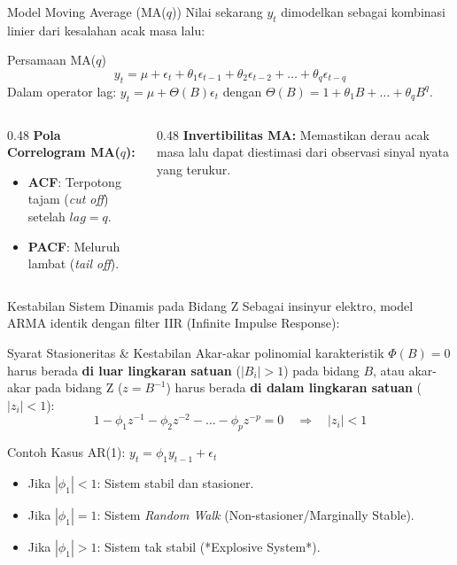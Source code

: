 \documentclass[aspectratio=169, 10pt]{beamer}
\begin{document}
\begin{frame}{Model Moving Average (MA($q$))}
    Nilai sekarang $y_t$ dimodelkan sebagai kombinasi linier dari kesalahan acak masa lalu:
    \begin{block}{Persamaan MA($q$)}
        \begin{equation}
            y_t = \mu + \epsilon_t + \theta_1 \epsilon_{t-1} + \theta_2 \epsilon_{t-2} + \dots + \theta_q \epsilon_{t-q}
        \end{equation}
        Dalam operator lag: $y_t = \mu + \Theta(B)\epsilon_t$ dengan $\Theta(B) = 1 + \theta_1 B + \dots + \theta_q B^q$.
    \end{block}
    \begin{columns}[T]
        \begin{column}{0.48\textwidth}
            \textbf{Pola Correlogram MA($q$):}
            \begin{itemize}
                \item \textbf{ACF}: Terpotong tajam (\textit{cut off}) setelah $lag = q$.
                \item \textbf{PACF}: Meluruh lambat (\textit{tail off}).
            \end{itemize}
        \end{column}
        \begin{column}{0.48\textwidth}
            \textbf{Invertibilitas MA:}
            Memastikan derau acak masa lalu dapat diestimasi dari observasi sinyal nyata yang terukur.
        \end{column}
    \end{columns}
\end{frame}

\begin{frame}{Kestabilan Sistem Dinamis pada Bidang Z}
    Sebagai insinyur elektro, model ARMA identik dengan filter IIR (Infinite Impulse Response):
    \begin{block}{Syarat Stasioneritas \& Kestabilan}
        Akar-akar polinomial karakteristik $\Phi(B) = 0$ harus berada \textbf{di luar lingkaran satuan} ($|B_i| > 1$) pada bidang $B$, atau akar-akar pada bidang Z ($z = B^{-1}$) harus berada \textbf{di dalam lingkaran satuan} ($|z_i| < 1$):
        \begin{equation}
            1 - \phi_1 z^{-1} - \phi_2 z^{-2} - \dots - \phi_p z^{-p} = 0 \quad \Longrightarrow \quad |z_i| < 1
        \end{equation}
    \end{block}
    \begin{alertblock}{Contoh Kasus AR(1): $y_t = \phi_1 y_{t-1} + \epsilon_t$}
        \begin{itemize}
            \item Jika $|\phi_1| < 1$: Sistem stabil dan stasioner.
            \item Jika $|\phi_1| = 1$: Sistem \textit{Random Walk} (Non-stasioner/Marginally Stable).
            \item Jika $|\phi_1| > 1$: Sistem tak stabil (*Explosive System*).
        \end{itemize}
    \end{alertblock}
\end{frame}
\end{document}

